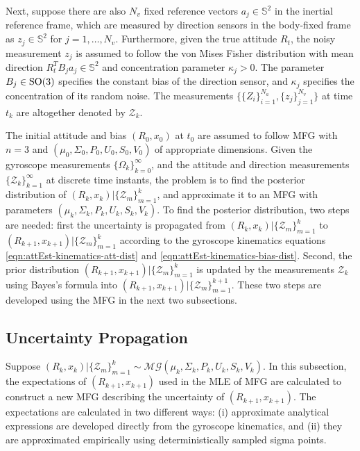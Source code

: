 Next, suppose there are also $N_v$ fixed reference vectors ${a}_j\in\mathbb{S}^2$ in the inertial reference frame, which are measured by direction sensors in the body-fixed frame as ${z}_j\in\mathbb{S}^2$ for $j=1,\ldots,N_v$.
Furthermore, given the true attitude $R_t$, the noisy measurement ${z}_j$ is assumed to follow the von Mises Fisher distribution \cite{mardia2009directional} with mean direction $R_t^TB_j{a}_j\in\mathbb{S}^2$ and concentration parameter $\kappa_j>0$.
The parameter $B_j\in\mathrm{SO}(3)$ specifies the constant bias of the direction sensor, and $\kappa_j$ specifies the concentration of its random noise.
The measurements $\Big\{\{Z_i\}_{i=1}^{N_a}, \{z_j\}_{j=1}^{N_v}\Big\}$ at time $t_k$ are altogether denoted by $\mathcal{Z}_k$.

The initial attitude and bias $(R_0,x_0)$ at $t_0$ are assumed to follow MFG with $n=3$ and $(\mu_0, \Sigma_0, P_0, U_0, S_0, V_0)$ of appropriate dimensions.
Given the gyroscope measurements $\{\Omega_k\}_{k=0}^\infty$, and the attitude and direction measurements $\{\mathcal{Z}_k\}_{k=1}^\infty$ at discrete time instants, the problem is to find the posterior distribution of $(R_k,x_k) | \{\mathcal{Z}_m\}_{m=1}^k$, and approximate it to an MFG with parameters $(\mu_k, \Sigma_k, P_k, U_k, S_k, V_k)$.
To find the posterior distribution, two steps are needed: first the uncertainty is propagated from $(R_k,x_k) | \{\mathcal{Z}_m\}_{m=1}^k$ to $(R_{k+1},x_{k+1}) | \{\mathcal{Z}_m\}_{m=1}^k$ according to the gyroscope kinematics equations \eqref{eqn:attEst-kinematics-att-dist} and \eqref{eqn:attEst-kinematics-bias-dist}.
Second, the prior distribution $(R_{k+1},x_{k+1}) | \{\mathcal{Z}_m\}_{m=1}^k$ is updated by the measurements $\mathcal{Z}_k$ using Bayes's formula into $(R_{k+1},x_{k+1}) | \{\mathcal{Z}_m\}_{m=1}^{k+1}$.
These two steps are developed using the MFG in the next two subsections.

\subsection{Uncertainty Propagation} \label{section:attEst-propagation}

Suppose $(R_k,x_k) | \{\mathcal{Z}_m\}_{m=1}^k \sim\mathcal{MG}(\mu_k, \Sigma_k, P_k, U_k, S_k, V_k)$. 
In this subsection, the expectations of $(R_{k+1},x_{k+1})$ used in the MLE of MFG are calculated to construct a new MFG describing the uncertainty of $(R_{k+1},x_{k+1})$.
The expectations are calculated in two different ways: (i) approximate analytical expressions are developed directly from the gyroscope kinematics, and (ii) they are approximated empirically using deterministically sampled sigma points.

